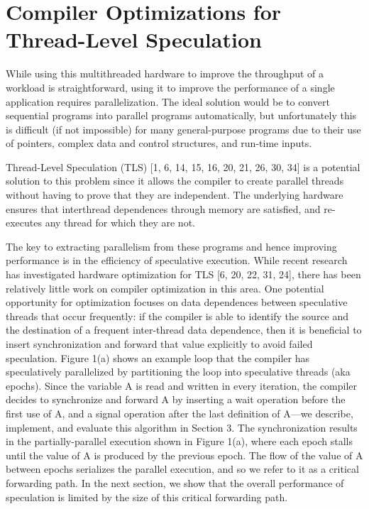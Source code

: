 \newpage 

\section{Compiler Optimizations for Thread-Level Speculation}


While
using this multithreaded hardware to improve the throughput of a
workload is straightforward, using it to improve the performance
of a single application requires parallelization. The ideal solution
would be to convert sequential programs into parallel programs automatically, but unfortunately this is difficult (if not impossible) for
many general-purpose programs due to their use of pointers, complex data and control structures, and run-time inputs.


Thread-Level Speculation (TLS) [1, 6, 14, 15, 16, 20, 21, 26,
30, 34] is a potential solution to this problem since it allows the
compiler to create parallel threads without having to prove that
they are independent. The underlying hardware ensures that interthread 
dependences through memory are satisfied, and re-executes
any thread for which they are not.

The key to extracting parallelism from these programs and hence
improving performance is in the efficiency of speculative execution. 
While recent research has investigated hardware optimization
for TLS [6, 20, 22, 31, 24], there has been relatively little work
on compiler optimization in this area. One potential opportunity for optimization focuses on data dependences between speculative
threads that occur frequently: if the compiler is able to identify the
source and the destination of a frequent inter-thread data dependence, then it is beneficial to insert synchronization and forward
that value explicitly to avoid failed speculation. Figure 1(a) shows
an example loop that the compiler has speculatively parallelized by
partitioning the loop into speculative threads (aka epochs). Since
the variable A is read and written in every iteration, the compiler decides to synchronize and forward A by inserting a wait operation
before the first use of A, and a signal operation after the last definition of A—we describe, implement, and evaluate this algorithm
in Section 3. The synchronization results in the partially-parallel
execution shown in Figure 1(a), where each epoch stalls until the
value of A is produced by the previous epoch. The flow of the value
of A between epochs serializes the parallel execution, and so we refer to it as a critical forwarding path. In the next section, we show
that the overall performance of speculation is limited by the size of
this critical forwarding path.

